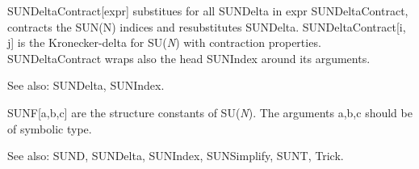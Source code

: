 





SUNDeltaContract[expr] substitues for all SUNDelta in expr SUNDeltaContract, contracts the SUN(N) indices and resubstitutes SUNDelta.
  SUNDeltaContract[i, j] is the Kronecker-delta for SU({\itshape N}) with contraction properties. SUNDeltaContract wraps also the head SUNIndex around
its arguments.

See also:  SUNDelta, SUNIndex.



SUNF[a,b,c] are the structure constants of SU({\itshape N}). The arguments a,b,c should be of symbolic type.



See also:  SUND, SUNDelta, SUNIndex, SUNSimplify, SUNT, Trick.











